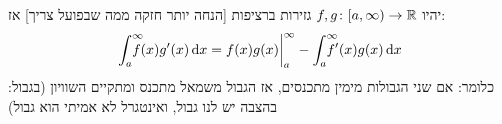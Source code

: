 \documentclass[]{../../../../tex/classes/styledArticle}
\begin{document}
	\begin{Theorem}
		יהיו $f, g \colon [a, \infty) \to \mathbb{R}$ גזירות ברציפות [הנחה יותר חזקה ממה שבפועל צריך] אז: 
		\[ \int^{\infty}_a \dequad f(x)g'(x)\dx = f(x)g(x)\bigg\vert^{\infty}_a - \int^{\infty}_a \dequad f'(x)g(x) \dx \]
		כלומר: 
		אם שני הגבולות מימין מתכנסים, אז הגבול משמאל מתכנס ומתקיים השוויון (בגבול: בהצבה יש לנו גבול, ואינטגרל לא אמיתי הוא גבול)
	\end{Theorem}
	
	
	
	
	
	
	
	\ndoc
\end{document}
